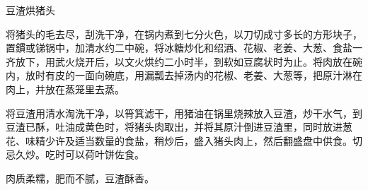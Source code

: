 \begin{recipe}{豆渣烘猪头}

\ingredients


\cooking

将猪头的毛去尽，刮洗干净，在锅内煮到七分火色，以刀切成寸多长的方形块子，置鏆或锑锅中，加清水约二中碗，将冰糖炒化和绍酒、花椒、老姜、大葱、食盐一齐放下，用武火烧开后，以文火烘约二小时半，到软如豆腐状时为止。将肉放在碗内，放时有皮的一面向碗底，用漏瓢去掉汤内的花椒、老姜、大葱等，把原汁淋在肉上，并放在蒸笼里去蒸。

将豆渣用清水淘洗干净，以筲箕滤干，用猪油在锅里烧辣放入豆渣，炒干水气，到豆渣已酥，吐油成黄色时，将猪头肉取出，并将其原汁倒进豆渣里，同时放进葱花、味精少许及适当数量的食盐，稍炒后，盛入猪头肉上，然后翻盛盘中供食。切忌久炒。吃时可以荷叶饼佐食。

\notes

肉质柔糯，肥而不腻，豆渣酥香。

\end{recipe}

